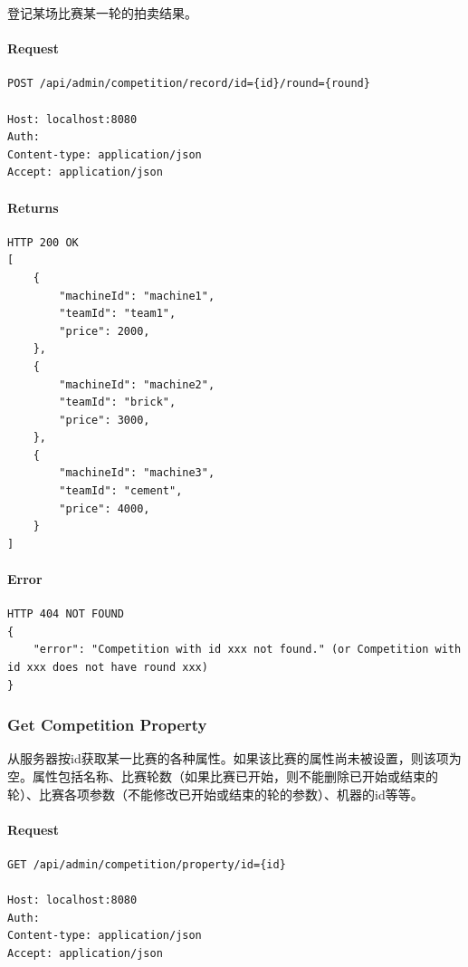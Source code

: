 \documentclass{article}
\begin{document}
登记某场比赛某一轮的拍卖结果。

\paragraph*{Request}
\begin{lstlisting}
POST /api/admin/competition/record/id={id}/round={round}

Host: localhost:8080
Auth:
Content-type: application/json
Accept: application/json
\end{lstlisting}

\paragraph*{Returns}
\begin{lstlisting}
HTTP 200 OK
[
    {
        "machineId": "machine1",
        "teamId": "team1",
        "price": 2000,
    },
    {
        "machineId": "machine2",
        "teamId": "brick",
        "price": 3000,
    },
    {
        "machineId": "machine3",
        "teamId": "cement",
        "price": 4000,
    }
]
\end{lstlisting}

\paragraph*{Error}
\begin{lstlisting}
HTTP 404 NOT FOUND
{
    "error": "Competition with id xxx not found." (or Competition with id xxx does not have round xxx)
}
\end{lstlisting}


\subsubsection{Get Competition Property}

从服务器按id获取某一比赛的各种属性。如果该比赛的属性尚未被设置，则该项为空。属性包括名称、比赛轮数（如果比赛已开始，则不能删除已开始或结束的轮）、比赛各项参数（不能修改已开始或结束的轮的参数）、机器的id等等。

\paragraph*{Request}
\begin{lstlisting}
GET /api/admin/competition/property/id={id}

Host: localhost:8080
Auth:
Content-type: application/json
Accept: application/json
\end{lstlisting}
\end{document}
